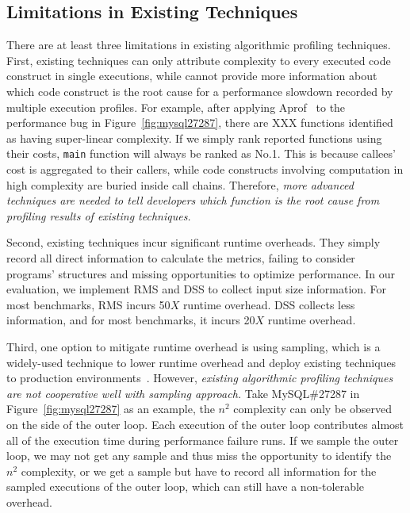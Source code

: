 \subsection{Limitations in Existing Techniques}
\label{subsec:existing}


%
There are at least three limitations in existing algorithmic profiling techniques. 
%
First, existing techniques can only 
attribute complexity to every executed code construct
in single executions, 
while cannot provide more information about 
which code construct is the root cause 
for a performance slowdown recorded by multiple 
execution profiles. 
For example, after applying Aprof~\cite{Aprof1,Aprof2} 
to the performance bug in Figure~\ref{fig:mysql27287}, 
there are {\color{red} XXX} functions identified 
as having super-linear complexity. 
If we simply rank reported functions using their costs, 
\texttt{main} function will always be ranked as No.1. 
This is because callees' cost is aggregated to their callers, 
while code constructs involving computation in high complexity 
are buried inside call chains.
Therefore, \emph{
more advanced techniques are needed to tell developers 
which function is the root cause from profiling results of existing techniques. 
}


Second, existing techniques incur significant runtime overheads. 
They simply record all direct information to calculate the metrics, 
failing to consider programs' structures and missing opportunities to optimize performance.
In our evaluation, we implement RMS and DSS to collect input size information. 
For most benchmarks, RMS incurs 50$X$ runtime overhead. 
DSS collects less information, and for most benchmarks, it incurs 20$X$ runtime overhead. 


Third, one option to mitigate runtime overhead is using
sampling, which is a widely-used technique to lower runtime overhead 
and deploy existing techniques to production 
environments~\cite{SongOOPSLA2014,liblit03,liblit05,CCI}. 
%
However, \emph{existing algorithmic profiling techniques are not cooperative well with
sampling approach.} 
Take MySQL\#27287 in Figure~\ref{fig:mysql27287} as an example,
the $n^2$ complexity can only be observed on the side of the outer loop. 
Each execution of the outer loop contributes almost all of 
the execution time during performance failure runs. 
If we sample the outer loop, 
we may not get any sample and thus miss the opportunity to 
identify the $n^2$ complexity, or we get a sample but have to 
record all 
information for the sampled executions of the outer loop, 
which can still  have a non-tolerable overhead. 


